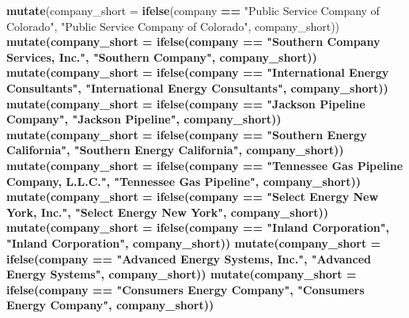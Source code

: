 \documentclass[]{article}
\newenvironment{Shaded}{\begin{snugshade}}{\end{snugshade}}
\newcommand{\KeywordTok}[1]{\textcolor[rgb]{0.13,0.29,0.53}{\textbf{#1}}}
\newcommand{\DataTypeTok}[1]{\textcolor[rgb]{0.13,0.29,0.53}{#1}}
\newcommand{\StringTok}[1]{\textcolor[rgb]{0.31,0.60,0.02}{#1}}
\newcommand{\OperatorTok}[1]{\textcolor[rgb]{0.81,0.36,0.00}{\textbf{#1}}}
\newcommand{\NormalTok}[1]{#1}
\begin{document}
\begin{Shaded}
\begin{Highlighting}[]
{{{{{{{{{{{{{{{{{{{{\StringTok{  }\KeywordTok{mutate}\NormalTok{(}\DataTypeTok{company_short =} \KeywordTok{ifelse}\NormalTok{(company }\OperatorTok{==}\StringTok{ "Public Service Company of Colorado"}\NormalTok{, }\StringTok{"Public Service Company of Colorado"}\NormalTok{, company_short))}\OperatorTok{%
\StringTok{  }\KeywordTok{mutate}\NormalTok{(}\DataTypeTok{company_short =} \KeywordTok{ifelse}\NormalTok{(company }\OperatorTok{==}\StringTok{ "Southern Company Services, Inc."}\NormalTok{, }\StringTok{"Southern Company"}\NormalTok{, company_short))}\OperatorTok{%
\StringTok{  }\KeywordTok{mutate}\NormalTok{(}\DataTypeTok{company_short =} \KeywordTok{ifelse}\NormalTok{(company }\OperatorTok{==}\StringTok{ "International Energy Consultants"}\NormalTok{, }\StringTok{"International Energy Consultants"}\NormalTok{, company_short))}\OperatorTok{%
\StringTok{  }\KeywordTok{mutate}\NormalTok{(}\DataTypeTok{company_short =} \KeywordTok{ifelse}\NormalTok{(company }\OperatorTok{==}\StringTok{ "Jackson Pipeline Company"}\NormalTok{, }\StringTok{"Jackson Pipeline"}\NormalTok{, company_short))}\OperatorTok{%
\StringTok{  }\KeywordTok{mutate}\NormalTok{(}\DataTypeTok{company_short =} \KeywordTok{ifelse}\NormalTok{(company }\OperatorTok{==}\StringTok{ "Southern Energy California"}\NormalTok{, }\StringTok{"Southern Energy California"}\NormalTok{, company_short))}\OperatorTok{%
\StringTok{  }\KeywordTok{mutate}\NormalTok{(}\DataTypeTok{company_short =} \KeywordTok{ifelse}\NormalTok{(company }\OperatorTok{==}\StringTok{ "Tennessee Gas Pipeline Company, L.L.C."}\NormalTok{, }\StringTok{"Tennessee Gas Pipeline"}\NormalTok{, company_short))}\OperatorTok{%
\StringTok{  }\KeywordTok{mutate}\NormalTok{(}\DataTypeTok{company_short =} \KeywordTok{ifelse}\NormalTok{(company }\OperatorTok{==}\StringTok{ "Select Energy New York, Inc."}\NormalTok{, }\StringTok{"Select Energy New York"}\NormalTok{, company_short))}\OperatorTok{%
\StringTok{  }\KeywordTok{mutate}\NormalTok{(}\DataTypeTok{company_short =} \KeywordTok{ifelse}\NormalTok{(company }\OperatorTok{==}\StringTok{ "Inland Corporation"}\NormalTok{, }\StringTok{"Inland Corporation"}\NormalTok{, company_short))}\OperatorTok{%
\StringTok{  }\KeywordTok{mutate}\NormalTok{(}\DataTypeTok{company_short =} \KeywordTok{ifelse}\NormalTok{(company }\OperatorTok{==}\StringTok{ "Advanced Energy Systems, Inc."}\NormalTok{, }\StringTok{"Advanced Energy Systems"}\NormalTok{, company_short))}\OperatorTok{%
\StringTok{  }\KeywordTok{mutate}\NormalTok{(}\DataTypeTok{company_short =} \KeywordTok{ifelse}\NormalTok{(company }\OperatorTok{==}\StringTok{ "Consumers Energy Company"}\NormalTok{, }\StringTok{"Consumers Energy Company"}\NormalTok{, company_short))}\OperatorTok{%
}}}}}}}}}}}}}}}}}}}}}}}}}}}}}}
\end{Highlighting}
\end{Shaded}
\end{document}
